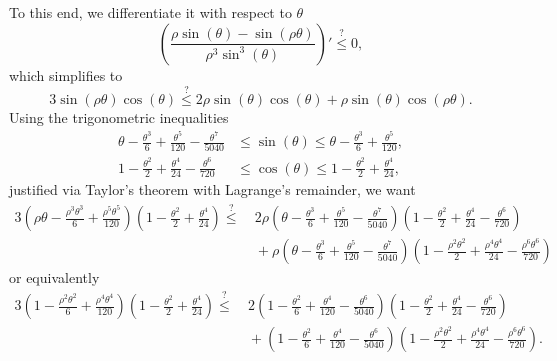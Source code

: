 \documentclass[letterpaper,onecolumn,11pt,accepted=2026-02-14]{quantumarticle}
\theoremstyle{remark}
\theoremstyle{plain}
\begin{document}
    To this end, we differentiate it with respect to $\theta$
    \begin{equation}
        \left(\frac{\rho\sin(\theta)-\sin(\rho\theta)}{\rho^3\sin^3(\theta)}\right)'
        \overset{?}{\leq}0,
    \end{equation}
    which simplifies to
    \begin{equation}
        3\sin(\rho\theta)\cos(\theta)
        \overset{?}{\leq}2\rho\sin(\theta)\cos(\theta)
        +\rho\sin(\theta)\cos(\rho\theta).
    \end{equation}
    Using the trigonometric inequalities
    \begin{equation}
    \begin{aligned}
        \theta-\frac{\theta^3}{6}+\frac{\theta^5}{120}-\frac{\theta^7}{5040}
        &\leq\sin(\theta)
        \leq\theta-\frac{\theta^3}{6}+\frac{\theta^5}{120},\\
        1-\frac{\theta^2}{2}+\frac{\theta^4}{24}-\frac{\theta^6}{720}
        &\leq\cos(\theta)
        \leq1-\frac{\theta^2}{2}+\frac{\theta^4}{24},
    \end{aligned}
    \end{equation}
    justified via Taylor's theorem with Lagrange's remainder, we want
    \begin{equation}
    \begin{aligned}
        3\left(\rho\theta-\frac{\rho^3\theta^3}{6}+\frac{\rho^5\theta^5}{120}\right)\left(1-\frac{\theta^2}{2}+\frac{\theta^4}{24}\right)
        \overset{?}{\leq}&\
        2\rho\left(\theta-\frac{\theta^3}{6}+\frac{\theta^5}{120}-\frac{\theta^7}{5040}\right)\left(1-\frac{\theta^2}{2}+\frac{\theta^4}{24}-\frac{\theta^6}{720}\right)\\
        &\ +\rho\left(\theta-\frac{\theta^3}{6}+\frac{\theta^5}{120}-\frac{\theta^7}{5040}\right)\left(1-\frac{\rho^2\theta^2}{2}+\frac{\rho^4\theta^4}{24}-\frac{\rho^6\theta^6}{720}\right)
    \end{aligned}
    \end{equation}
    or equivalently
    \begin{equation}
    \begin{aligned}
        3\left(1-\frac{\rho^2\theta^2}{6}+\frac{\rho^4\theta^4}{120}\right)\left(1-\frac{\theta^2}{2}+\frac{\theta^4}{24}\right)
        \overset{?}{\leq}&\
        2\left(1-\frac{\theta^2}{6}+\frac{\theta^4}{120}-\frac{\theta^6}{5040}\right)\left(1-\frac{\theta^2}{2}+\frac{\theta^4}{24}-\frac{\theta^6}{720}\right)\\
        &\ +\left(1-\frac{\theta^2}{6}+\frac{\theta^4}{120}-\frac{\theta^6}{5040}\right)\left(1-\frac{\rho^2\theta^2}{2}+\frac{\rho^4\theta^4}{24}-\frac{\rho^6\theta^6}{720}\right).
    \end{aligned}
    \end{equation}
\end{document}
